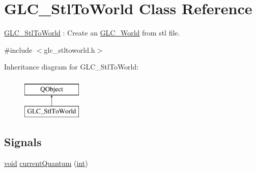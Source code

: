 \hypertarget{class_g_l_c___stl_to_world}{\section{G\-L\-C\-\_\-\-Stl\-To\-World Class Reference}
\label{class_g_l_c___stl_to_world}
}


\hyperlink{class_g_l_c___stl_to_world}{G\-L\-C\-\_\-\-Stl\-To\-World} \-: Create an \hyperlink{class_g_l_c___world}{G\-L\-C\-\_\-\-World} from stl file.  




{\ttfamily \#include $<$glc\-\_\-stltoworld.\-h$>$}

Inheritance diagram for G\-L\-C\-\_\-\-Stl\-To\-World\-:\begin{figure}[H]
\begin{center}
\leavevmode
\includegraphics[height=2.000000cm]{class_g_l_c___stl_to_world}
\end{center}
\end{figure}
\subsection*{Signals}
\begin{DoxyCompactItemize}
\item 
\hyperlink{group___u_a_v_objects_plugin_ga444cf2ff3f0ecbe028adce838d373f5c}{void} \hyperlink{class_g_l_c___stl_to_world_a19deab3ed35661d1ec7221131cdcc511}{current\-Quantum} (\hyperlink{ioapi_8h_a787fa3cf048117ba7123753c1e74fcd6}{int})
\end{DoxyCompactItemize}
